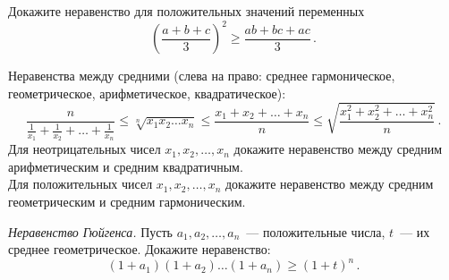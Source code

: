 


\begin{problems}



\item
Докажите неравенство для положительных значений переменных
\[
    \left( \frac{a + b + c}{3} \right)^2
\geq
    \frac{a b + b c + a c}{3}
\, . \]

\item
Неравенства между средними (слева на право: среднее гармоническое,
геометрическое, арифметическое, квадратическое):
\[
    \frac{n}{\frac{1}{x_{1}} + \frac{1}{x_{2}} + \ldots + \frac{1}{x_{n}}}
\leq
    \sqrt[n]{x_{1} x_{2} \ldots x_{n}}
\leq
    \frac{x_{1}+x_{2}+\dots+x_{n}}{n}
\leq
    \sqrt{\frac{x_{1}^2+x_{2}^2+\dots+x_{n}^2}{n}}
\, . \]
\subproblem
Для неотрицательных чисел $x_{1}, x_{2}, \ldots,x_{n}$ докажите неравенство
между средним арифметическим и средним квадратичным.
\\
\subproblem
Для положительных чисел $x_{1}, x_{2}, \ldots,x_{n}$ докажите неравенство
между средним геометрическим и средним гармоническим.

\item
\emph{Неравенство Гюйгенса.}
Пусть $a_{1}, a_{2}, \ldots, a_{n}$~--- положительные числа,
$t$~--- их среднее геометрическое.
Докажите неравенство:
\[
    (1 + a_{1}) (1 + a_{2}) \ldots (1 + a_{n})
\geq
    (1 + t)^{n}
\, . \]


\end{problems}
